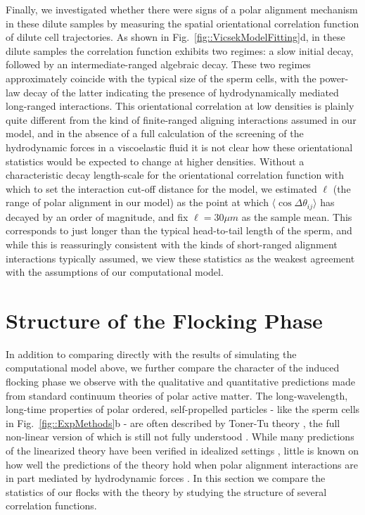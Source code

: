 \documentclass[reprint,unsortedaddress,amsmath,amssymb,aps,pre]{revtex4-2}
\begin{document}
Finally, we investigated whether there were signs of a polar alignment mechanism in these dilute samples by measuring the spatial orientational correlation function of dilute cell trajectories. As shown in Fig.~\ref{fig::VicsekModelFitting}d, in these dilute samples the correlation function exhibits two regimes: a slow initial decay, followed by an intermediate-ranged algebraic decay. These two regimes approximately coincide with the typical size of the sperm cells, with the power-law decay of the latter indicating the presence of hydrodynamically mediated long-ranged interactions. This orientational correlation at low densities is plainly quite different from the kind of finite-ranged aligning interactions assumed in our model, and in the absence of a full calculation of the screening of the hydrodynamic forces in a viscoelastic fluid it is not clear how these orientational statistics would be expected to change at higher densities. Without a characteristic decay length-scale for the orientational correlation function with which to set the interaction cut-off distance for the model, we estimated $\ell$ (the range of polar alignment in our model) as the point at which $\langle{\cos\Delta\theta_{ij}}\rangle$ has decayed by an order of magnitude, and fix $\ell=30\mu{m}$ as the sample mean. This corresponds to just longer than the typical head-to-tail length of the sperm, and while this is reassuringly consistent with the kinds of short-ranged alignment interactions typically assumed, we view these statistics as the weakest agreement with the assumptions of our computational model.




\section{Structure of the Flocking Phase}
In addition to comparing directly with the results of simulating the computational model above, we further compare the character of the induced flocking phase we observe with the qualitative and quantitative predictions made from standard continuum theories of polar active matter. The long-wavelength, long-time properties of polar ordered, self-propelled particles - like the sperm cells in Fig.~\ref{fig::ExpMethods}b - are often described by Toner-Tu theory \cite{1998_Toner}, the full non-linear version of which is still not fully understood \cite{2019_Chate}. While many predictions of the linearized theory have been verified in idealized settings \cite{2018_Geyer}, little is known on how well the predictions of the theory hold when polar alignment interactions are in part mediated by hydrodynamic forces \cite{heidenreich2016hydrodynamic}. In this section we compare the statistics of our flocks with the theory by studying the structure of several correlation functions.
\end{document}

